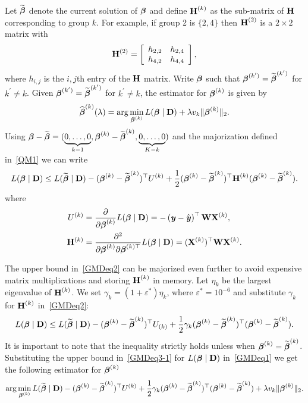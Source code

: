 Let $\widetilde{\boldsymbol{\beta}}$ denote the current solution of $\boldsymbol{\beta}$ and define $\textbf{H}^{(k)}$ as the sub-matrix of $\textbf{H}$ corresponding to group $k$. For example, if group 2 is $\{2,4\}$ then $\textbf{H}^{(2)}$ is a $2\times2$ matrix with
\[
\textbf{H}^{(2)}=\left[\begin{array}{cc}
h_{2,2} & h_{2,4}\\
h_{4,2} & h_{4,4}
\end{array}\right],
\]
where $h_{i,j}$ is the $i,j$th entry of the $\textbf{H}$ matrix. Write $\boldsymbol{\beta}$ such that $\boldsymbol{\beta}^{(k^{\prime})}=\widetilde{\boldsymbol{\beta}}^{(k^{\prime})}$ for $k^{\prime}\ne k$. Given $\boldsymbol{\beta}^{(k^{\prime})}=\widetilde{\boldsymbol{\beta}}^{(k^{\prime})}$ for $k^{\prime}\ne k$, the estimator for $\boldsymbol{\beta}^{(k)}$ is given by
\begin{equation}
\widehat{\boldsymbol{\beta}}^{(k)}(\lambda) = \arg\min_{\boldsymbol{\beta}^{(k)}}L(\boldsymbol{\beta}\mid\textbf{D})+\lambda v_{k}\Vert \boldsymbol{\beta}^{(k)}\Vert_{2}.\label{GMDeq1}
\end{equation}
Using $\boldsymbol{\beta}-\widetilde{\boldsymbol{\beta}}=(\underbrace{0,\ldots,0}_{k-1},\boldsymbol{\beta}^{(k)}-\widetilde{\boldsymbol{\beta}}^{(k)},\underbrace{0,\ldots,0}_{K-k})$ and the majorization defined in~\eqref{QM1} we can write
\begin{equation}
L(\boldsymbol{\beta}\mid\textbf{D})\le L(\widetilde{\boldsymbol{\beta}}\mid\textbf{D})-(\boldsymbol{\beta}^{(k)}-\widetilde{\boldsymbol{\beta}}^{(k)})^{\top}U^{(k)}+\frac{1}{2}(\boldsymbol{\beta}^{(k)}-\widetilde{\boldsymbol{\beta}}^{(k)})^{\top}\textbf{H}^{(k)}(\boldsymbol{\beta}^{(k)}-\widetilde{\boldsymbol{\beta}}^{(k)}).\label{GMDeq2}
\end{equation}
where
\begin{align}
U^{(k)} & =\frac{\partial}{\partial\boldsymbol{\beta}^{(k)}}L(\boldsymbol{\beta}\mid\textbf{D})=-\left(\textbf{\emph{y}}-\hat{\textbf{\emph{y}}}\right)^{\top}\mathbf{W}\mathbf{X}^{(k)},\label{eq:gradientj-1}\\
\mathbf{H}^{(k)} & =\frac{\partial^{2}}{\partial\boldsymbol{\beta}^{(k)}\partial \boldsymbol{\beta}^{(k)\top}}L(\boldsymbol{\beta}\mid\textbf{D})=(\mathbf{X}^{(k)})^{\top}\mathbf{W}\mathbf{X}^{(k)}.\label{eq:hessianj-1}
\end{align}

The upper bound in~\eqref{GMDeq2} can be majorized even further to avoid expensive matrix multiplications and storing $\textbf{H}^{(k)}$ in memory. Let $\eta_{k}$ be the largest eigenvalue of $\textbf{H}^{(k)}$. We set $\gamma_{k}=(1+\varepsilon^{*})\eta_{k}$, where $\varepsilon^{*}=10^{-6}$ and substitute $\gamma_{k}$ for $\textbf{H}^{(k)}$ in~\eqref{GMDeq2}:
\begin{equation}
L(\boldsymbol{\beta}\mid\textbf{D})\leq L(\widetilde{\boldsymbol{\beta}}\mid\textbf{D})-(\boldsymbol{\beta}^{(k)}-\widetilde{\boldsymbol{\beta}}^{(k)})^{\top}U_{(k)}+\frac{1}{2}\gamma_{k}(\boldsymbol{\beta}^{(k)}-\widetilde{\boldsymbol{\beta}}^{(k)})^{\top}(\boldsymbol{\beta}^{(k)}-\widetilde{\boldsymbol{\beta}}^{(k)}).\label{GMDeq3-1}
\end{equation}
It is important to note that the inequality strictly holds unless when $\boldsymbol{\beta}^{(k)}=\widetilde{\boldsymbol{\beta}}^{(k)}$. Substituting the upper bound in~\eqref{GMDeq3-1} for $L(\boldsymbol{\beta}\mid\textbf{D})$ in~\eqref{GMDeq1} we get the following estimator for $\boldsymbol{\beta}^{(k)}$
\begin{equation}
\arg\min_{\boldsymbol{\beta}^{(k)}}L(\widetilde{\boldsymbol{\beta}}\mid\textbf{D})-(\boldsymbol{\beta}^{(k)}-\widetilde{\boldsymbol{\beta}}^{(k)})^{\top}U^{(k)}+\frac{1}{2}\gamma_{k}(\boldsymbol{\beta}^{(k)}-\widetilde{\boldsymbol{\beta}}^{(k)})^{\top}(\boldsymbol{\beta}^{(k)}-\widetilde{\boldsymbol{\beta}}^{(k)})+\lambda v_{k}\Vert\boldsymbol{\beta}^{(k)}\Vert_{2}.\label{GMDeq4-1}
\end{equation}

